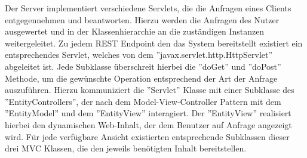 Der Server implementiert verschiedene Servlets, die die Anfragen eines Clients entgegennehmen und beantworten. Hierzu werden die Anfragen des Nutzer ausgewertet und in der Klassenhierarchie an die zuständigen Instanzen weitergeleitet. Zu jedem REST Endpoint den das System bereitstellt existiert ein entsprechendes Servlet, welches von dem ''javax.servlet.http.HttpServlet'' abgeleitet ist. Jede Subklasse überschreit hierbei die ''doGet'' und ''doPost'' Methode, um die gewünschte Operation entsprechend der Art der Anfrage auszuführen. Hierzu kommuniziert die ''Servlet'' Klasse mit einer Subklasse des ''EntityControllers'', der nach dem Model-View-Controller Pattern mit dem ''EntityModel'' und dem ''EntityView'' interagiert. Der ''EntityView'' realisiert hierbei den dynamischen Web-Inhalt, der dem Benutzer auf Anfrage angezeigt wird. Für jede verfügbare Ansicht existierten entsprechende Subklassen dieser drei MVC Klassen, die den jeweils benötigten Inhalt bereitstellen. 